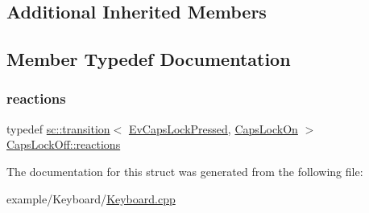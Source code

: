 \subsection*{Additional Inherited Members}


\subsection{Member Typedef Documentation}
\mbox{\label{struct_caps_lock_off_a22aac8608f02e93d4f240e2c1f038b22}} 
\subsubsection{\texorpdfstring{reactions}{reactions}}
{\footnotesize\ttfamily typedef \mbox{\hyperlink{classboost_1_1statechart_1_1transition}{sc\+::transition}}$<$ \mbox{\hyperlink{struct_ev_caps_lock_pressed}{Ev\+Caps\+Lock\+Pressed}}, \mbox{\hyperlink{struct_caps_lock_on}{Caps\+Lock\+On}} $>$ \mbox{\hyperlink{struct_caps_lock_off_a22aac8608f02e93d4f240e2c1f038b22}{Caps\+Lock\+Off\+::reactions}}}



The documentation for this struct was generated from the following file\+:\begin{DoxyCompactItemize}
\item 
example/\+Keyboard/\mbox{\hyperlink{_keyboard_8cpp}{Keyboard.\+cpp}}\end{DoxyCompactItemize}
